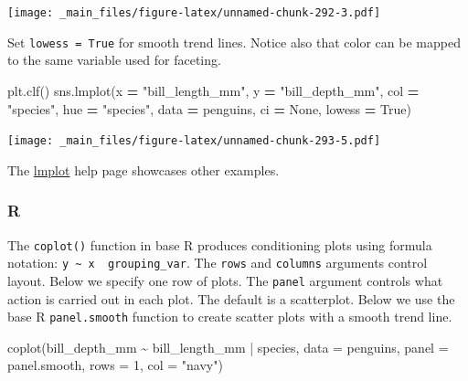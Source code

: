 \documentclass[
]{book}
\newenvironment{Shaded}{\begin{snugshade}}{\end{snugshade}}
\newcommand{\AttributeTok}[1]{\textcolor[rgb]{0.77,0.63,0.00}{#1}}
\newcommand{\DecValTok}[1]{\textcolor[rgb]{0.00,0.00,0.81}{#1}}
\newcommand{\FunctionTok}[1]{\textcolor[rgb]{0.00,0.00,0.00}{#1}}
\newcommand{\NormalTok}[1]{#1}
\newcommand{\OperatorTok}[1]{\textcolor[rgb]{0.81,0.36,0.00}{\textbf{#1}}}
\newcommand{\SpecialCharTok}[1]{\textcolor[rgb]{0.00,0.00,0.00}{#1}}
\newcommand{\StringTok}[1]{\textcolor[rgb]{0.31,0.60,0.02}{#1}}
\newcommand{\VariableTok}[1]{\textcolor[rgb]{0.00,0.00,0.00}{#1}}
\begin{document}
\texttt{[image: \_main\_files/figure-latex/unnamed-chunk-292-3.pdf]}

Set \texttt{lowess\ =\ True} for smooth trend lines. Notice also that color can be mapped to the same variable used for faceting.

\begin{Shaded}
\begin{Highlighting}[]
\NormalTok{plt.clf()}
\NormalTok{sns.lmplot(x }\OperatorTok{=} \StringTok{"bill\_length\_mm"}\NormalTok{, y }\OperatorTok{=} \StringTok{"bill\_depth\_mm"}\NormalTok{, }
\NormalTok{           col }\OperatorTok{=} \StringTok{"species"}\NormalTok{, hue }\OperatorTok{=} \StringTok{"species"}\NormalTok{,}
\NormalTok{           data }\OperatorTok{=}\NormalTok{ penguins, ci }\OperatorTok{=} \VariableTok{None}\NormalTok{, lowess }\OperatorTok{=} \VariableTok{True}\NormalTok{)}
\end{Highlighting}
\end{Shaded}

\texttt{[image: \_main\_files/figure-latex/unnamed-chunk-293-5.pdf]}

The \href{https://seaborn.pydata.org/generated/seaborn.lmplot.html\#seaborn.lmplot}{lmplot} help page showcases other examples.

\hypertarget{r-46}{%
\subsubsection*{R}\label{r-46}}

The \texttt{coplot()} function in base R produces conditioning plots using formula notation: \texttt{y\ \textasciitilde{}\ x\ \textbar{}\ grouping\_var}. The \texttt{rows} and \texttt{columns} arguments control layout. Below we specify one row of plots. The \texttt{panel} argument controls what action is carried out in each plot. The default is a scatterplot. Below we use the base R \texttt{panel.smooth} function to create scatter plots with a smooth trend line.

\begin{Shaded}
\begin{Highlighting}[]
\FunctionTok{coplot}\NormalTok{(bill\_depth\_mm }\SpecialCharTok{\textasciitilde{}}\NormalTok{ bill\_length\_mm }\SpecialCharTok{|}\NormalTok{ species, }
       \AttributeTok{data =}\NormalTok{ penguins,}
       \AttributeTok{panel =}\NormalTok{ panel.smooth,}
       \AttributeTok{rows =} \DecValTok{1}\NormalTok{, }\AttributeTok{col =} \StringTok{"navy"}\NormalTok{)}
\end{Highlighting}
\end{Shaded}
\end{document}
